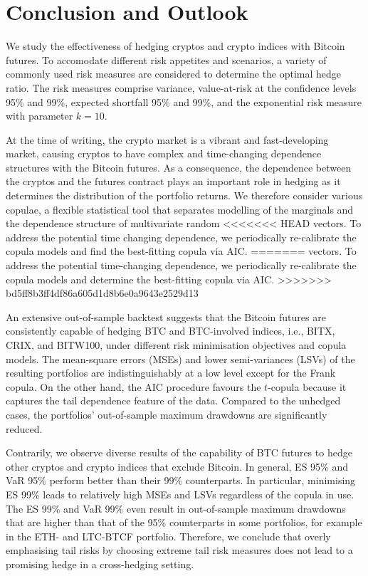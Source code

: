 \section{Conclusion and Outlook}\label{sec:conclusion-and-outlook}
We study the effectiveness of hedging cryptos and crypto indices with
Bitcoin futures.
To accomodate different risk appetites and scenarios, a variety of
commonly used risk measures are considered to determine the optimal
hedge ratio. The risk measures comprise variance, value-at-risk at
the confidence levels 95\% and 99\%, expected shortfall 95\% and 99\%,
and the exponential risk measure with parameter $k=10$.

At the time of writing, the crypto market is a vibrant and
fast-developing market, causing cryptos to have complex and
time-changing dependence structures with the Bitcoin futures.
As a consequence, the dependence between the cryptos and the futures
contract plays an important role in hedging as it determines the
distribution of the portfolio returns. We therefore consider various
copulae, a flexible statistical tool that separates modelling of the
marginals and the dependence structure of multivariate random
<<<<<<< HEAD
vectors. To address the potential time changing dependence, we
periodically re-calibrate the copula models and find the best-fitting
copula via AIC.
=======
vectors. To address the potential time-changing dependence, we
periodically re-calibrate the copula models and determine the
best-fitting copula via AIC. 
>>>>>>> bd5ff8b3ff4df86a605d1d8b6e0a9643e2529d13

An extensive out-of-sample backtest suggests that the Bitcoin futures
are consistently capable of hedging BTC and BTC-involved indices,
i.e., BITX, CRIX, and BITW100, under different risk minimisation
objectives 
and copula models. The mean-square errors (MSEs) and lower
semi-variances (LSVs) of the resulting portfolios are
indistinguishably at a low level except for the Frank copula. 
On the other hand, the AIC procedure favours the $t$-copula because it 
captures the tail dependence feature of the data.
Compared to the unhedged cases, the
portfolios' out-of-sample maximum drawdowns are significantly reduced. 

Contrarily, we observe diverse results of the capability of BTC
futures to hedge other cryptos and crypto indices that exclude Bitcoin. 
In general, ES 95\% and VaR 95\% perform better than their 99\%
counterparts. In particular, minimising ES 99\% leads to relatively
high MSEs and LSVs regardless of the copula in use. The ES 99\% and
VaR 99\% even result in out-of-sample maximum drawdowns that are
higher than that of the 95\% counterparts in some portfolios, 
for example in the ETH- and LTC-BTCF portfolio.
Therefore, we conclude that overly emphasising tail risks by choosing
extreme tail risk measures does not lead to a promising hedge in a
cross-hedging setting. 

